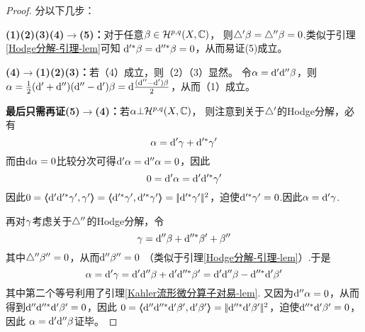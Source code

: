 \begin{proof}分以下几步：

\textbf{(1)(2)(3)(4)$\to$(5)：}对于任意$\beta\in\mathcal{H}^{p,q}(X,\mathbb{C})$，
则$\triangle'\beta=\triangle''\beta=0$.类似于引理\ref{Hodge分解-引理-lem}可知
$\mathrm{d}'^*\beta=\mathrm{d}''^*\beta=0$，从而易证(5)成立。

\textbf{(4)$\to$(1)(2)(3)：}若（4）成立，则（2）（3）显然。
令$\alpha=\mathrm{d}'\mathrm{d}''\beta$，则$\alpha=\frac{1}{2}(\mathrm{d}'+\mathrm{d}'')(\mathrm{d}''-\mathrm{d}')\beta=
\mathrm{d}\frac{(\mathrm{d}''-\mathrm{d}')\beta}{2}$，从而（1）成立。

\textbf{最后只需再证(5)$\to$(4)：}若$\alpha\bot\mathcal{H}^{p,q}(X,\mathbb{C})$，
则注意到关于$\triangle'$的Hodge分解，必有
$$\alpha=\mathrm{d}'\gamma+\mathrm{d}'^*\gamma'$$
而由$\mathrm{d}\alpha=0$比较分次可得$\mathrm{d}'\alpha=\mathrm{d}''\alpha=0$，因此
$$0=\mathrm{d}'\alpha=\mathrm{d}'\mathrm{d}'^*\gamma'$$
因此$0=\ppair{\td'\td'^*\gma'}{\gma'}=\ppair{\td'^*\gma'}{\td'^*\gma'}
=\norm{\td'^*\gma'}^2$，迫使$\mathrm{d}'^*\gamma'=0$.因此$\alpha=\mathrm{d}'\gamma$.

再对$\gamma$考虑关于$\triangle''$的Hodge分解，令
$$
  \gamma=\mathrm{d}''\beta+\mathrm{d}''^*\beta'+\beta''
$$
其中$\triangle''\beta''=0$，从而$\mathrm{d}''\beta''=0$
（类似于引理\ref{Hodge分解-引理-lem}）.于是
$$
  \alpha=\mathrm{d}'\gamma
=
  \mathrm{d}'\mathrm{d}''\beta+\mathrm{d}'\mathrm{d}''^*\beta'
=
  \mathrm{d}'\mathrm{d}''\beta-\mathrm{d}''^*\mathrm{d}'\beta'
$$
其中第二个等号利用了引理\ref{Kahler流形微分算子对易-lem}.
又因为$\mathrm{d}''\alpha=0$，从而得到$\mathrm{d}''\mathrm{d}''^*\mathrm{d}'\beta'=0$，因此
$0=\langle\!\! \langle \mathrm{d}''\mathrm{d}''^*\mathrm{d}'\beta',\mathrm{d}'\beta' \rangle\!\! \rangle
=|\!|\mathrm{d}''^*\mathrm{d}'\beta'|\!|^2$，迫使$\mathrm{d}''^*\mathrm{d}'\beta'=0$，因此
$\alpha=\mathrm{d}'\mathrm{d}''\beta$证毕。
\end{proof}


